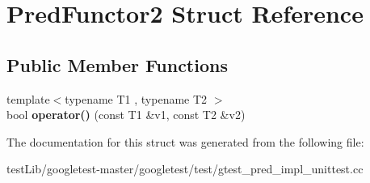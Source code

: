 \hypertarget{structPredFunctor2}{}\section{Pred\+Functor2 Struct Reference}
\label{structPredFunctor2}
\subsection*{Public Member Functions}
\begin{DoxyCompactItemize}
\item 
\mbox{\label{structPredFunctor2_a2142c86e4c0a3139e167dd3f13eb7f6f}} 
{\footnotesize template$<$typename T1 , typename T2 $>$ }\\bool {\bfseries operator()} (const T1 \&v1, const T2 \&v2)
\end{DoxyCompactItemize}


The documentation for this struct was generated from the following file\+:\begin{DoxyCompactItemize}
\item 
test\+Lib/googletest-\/master/googletest/test/gtest\+\_\+pred\+\_\+impl\+\_\+unittest.\+cc\end{DoxyCompactItemize}
